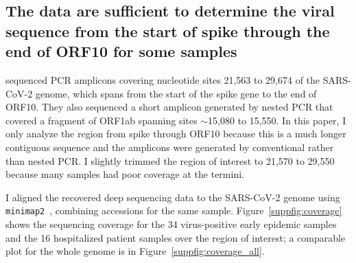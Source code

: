 \documentclass[9pt,twocolumn,twoside]{gsajnl_modified}
\begin{document}
\subsection{The data are sufficient to determine the viral sequence from the start of spike through the end of ORF10 for some samples}
\citet{wang2020medRxiv} sequenced PCR amplicons covering nucleotide sites 21,563 to 29,674 of the SARS-CoV-2 genome, which spans from the start of the spike gene to the end of ORF10.
They also sequenced a short amplicon generated by nested PCR that covered a fragment of ORF1ab spanning sites $\sim$15,080 to 15,550.
In this paper, I only analyze the region from spike through ORF10 because this is a much longer contiguous sequence and the amplicons were generated by conventional rather than nested PCR.
I slightly trimmed the region of interest to 21,570 to 29,550 because many samples had poor coverage at the termini.

I aligned the recovered deep sequencing data to the SARS-CoV-2 genome using \texttt{minimap2}~\citep{li2018minimap2}, combining accessions for the same sample.
Figure~\ref{suppfig:coverage} shows the sequencing coverage for the 34 virus-positive early epidemic samples and the 16 hospitalized patient samples over the region of interest; a comparable plot for the whole genome is in Figure~\ref{suppfig:coverage_all}.
\end{document}
